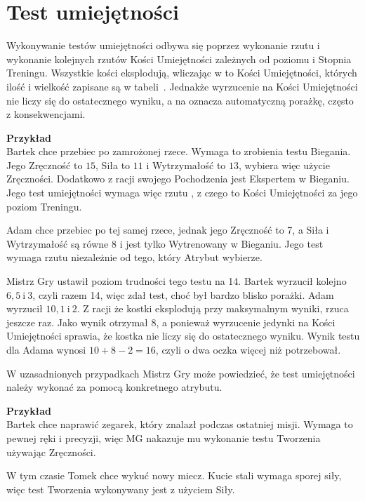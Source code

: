 \section{Test umiejętności}

Wykonywanie testów umiejętności odbywa się poprzez wykonanie rzutu   i
wykonanie kolejnych rzutów Kości Umiejętności zależnych  od  poziomu  i  Stopnia
Treningu.  Wszystkie  kości  eksplodują,  wliczając  w	to	Kości  Umiejętności,
których  ilość	i  wielkość  zapisane  są	w	tabeli~.
Jednakże wyrzucenie  	na	Kości  Umiejętności  nie  liczy  się  do
ostatecznego wyniku, a  na  oznacza automatyczną	porażkę,
często z konsekwencjami.


\begin{tcolorbox}
    {\large\bfseries Przykład}\\
	Bartek chce  przebiec  po  zamrożonej  rzece.	Wymaga	to	zrobienia  testu
	Biegania.  Jego Zręczność to $15$, Siła to	$11$  i  Wytrzymałość  to  $13$,
	wybiera więc użycie Zręczności.  Dodatkowo z racji swojego Pochodzenia	jest
	Ekspertem w Bieganiu.  Jego test umiejętności wymaga więc rzutu ,
	z  czego    to  Kości  Umiejętności	za	jego  poziom   Treningu.

	Adam chce przebiec po tej samej rzece, jednak jego Zręczność to 7, a Siła  i
	Wytrzymałość są równe 8 i jest tylko  Wytrenowany  w  Bieganiu.   Jego	test
	wymaga rzutu  niezależnie od tego, który  Atrybut  wybierze.

	Mistrz Gry ustawił poziom trudności  tego  testu  na  14.	Bartek	wyrzucił
	kolejno $6, 5\ \text{i}\ 3$, czyli razem 14, więc zdał test, choć był bardzo
	blisko porażki.  Adam wyrzucił $10, 1\ \text{i}\  2$.	Z  racji  że  kostki
    eksplodują przy maksymalnym wyniki, rzuca  jeszcze raz. Jako wynik
	otrzymał $8$, a ponieważ wyrzucenie jedynki na Kości  Umiejętności	sprawia,
    że kostka nie liczy się do ostatecznego wyniku. Wynik testu dla Adama wynosi
	$  10  +  8  -	2  =  16$,	czyli  o  dwa  oczka  więcej  niż	potrzebował.
\end{tcolorbox}

W uzasadnionych przypadkach Mistrz Gry może  powiedzieć,  że  test	umiejętności
należy wykonać za  pomocą  konkretnego	atrybutu.
\begin{tcolorbox}
    {\large\bfseries Przykład}\\
	Bartek chce naprawić zegarek, który znalazł podczas ostatniej misji.  Wymaga
	to pewnej ręki i precyzji, więc MG nakazuje  mu  wykonanie	testu  Tworzenia
    używając Zręczności.

	W tym czasie Tomek chce wykuć nowy miecz.  Kucie stali wymaga  sporej  siły,
    więc test Tworzenia wykonywany jest z użyciem Siły.
\end{tcolorbox}

